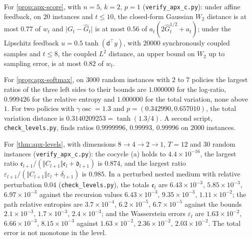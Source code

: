 \begin{numcheck}\label{chk:apx-levels}
For \cref{prop:apx-score}, with $n=5$, $k=2$, $p=1$ (\texttt{verify\_apx\_c.py}): under affine feedback, on $20$ instances and $t\le10$, the closed-form Gaussian $W_2$ distance is at most $0.77$ of $w_t$ and $\lvert G_t-\hat G_t\rvert$ is at most $0.56$ of $a_t(2\hat G_t^{1/2}+a_t)$; under the Lipschitz feedback $u=0.5\tanh(\mathsf d^\top y)$, with $20000$ synchronously coupled samples and $t\le8$, the coupled $L^2$ distance, an upper bound on $W_2$ up to sampling error, is at most $0.82$ of $w_t$.

For \cref{prop:apx-softmax}, on $3000$ random instances with $2$ to $7$ policies the largest ratios of the three left sides to their bounds are $1.000000$ for the log-ratio, $0.999426$ for the relative entropy and $1.000000$ for the total variation, none above $1$. For two policies with $\gamma\operatorname{osc}=1.3$ and $p=(0.342990,0.657010)$, the total variation distance is $0.3140209253=\tanh(1.3/4)$. A second script, \texttt{check\_levels.py}, finds ratios $0.9999996$, $0.99993$, $0.99996$ on $2000$ instances.

For \cref{thm:apx-levels}, with dimensions $8\to4\to2\to1$, $T=12$ and $30$ random instances (\texttt{verify\_apx\_c.py}): the cocycle (a) holds to $4.4\times10^{-16}$, the largest ratio $\mathfrak e_{l+1}/(\Vert C_{l+1}\Vert\mathfrak e_l+\mathfrak d_{l+1})$ is $0.874$, and the largest ratio $\varepsilon_{l+1}/(\Vert C_{l+1}\Vert\varepsilon_l+\delta_{l+1})$ is $0.985$. In a perturbed nested medium with relative perturbation $0.04$ (\texttt{check\_levels.py}), the totals $\mathfrak e_l$ are $6.43\times10^{-3}$, $5.85\times10^{-3}$, $6.97\times10^{-3}$ against the recursion values $6.43\times10^{-3}$, $9.35\times10^{-3}$, $1.11\times10^{-2}$; the path relative entropies are $3.7\times10^{-4}$, $6.2\times10^{-5}$, $6.7\times10^{-5}$ against the bounds $2.1\times10^{-3}$, $1.7\times10^{-3}$, $2.4\times10^{-3}$; and the Wasserstein errors $\varepsilon_l$ are $1.63\times10^{-2}$, $6.66\times10^{-3}$, $8.15\times10^{-3}$ against $1.63\times10^{-2}$, $2.36\times10^{-2}$, $2.03\times10^{-2}$. The total error is not monotone in the level.
\end{numcheck}


